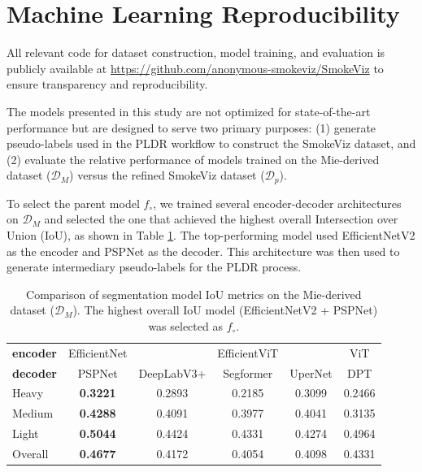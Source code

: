 \documentclass{article}
\begin{document}
\section{Machine Learning Reproducibility}

All relevant code for dataset construction, model training, and evaluation is publicly available at \url{https://github.com/anonymous-smokeviz/SmokeViz} to ensure transparency and reproducibility.

The models presented in this study are not optimized for state-of-the-art performance but are designed to serve two primary purposes: (1) generate pseudo-labels used in the PLDR workflow to construct the SmokeViz dataset, and (2) evaluate the relative performance of models trained on the Mie-derived dataset (\(\mathcal{D}_M\)) versus the refined SmokeViz dataset (\(\mathcal{D}_p\)).

To select the parent model \(f_{\circ}\), we trained several encoder-decoder architectures on \(\mathcal{D}_M\) and selected the one that achieved the highest overall Intersection over Union (IoU), as shown in Table \ref{child}. The top-performing model used EfficientNetV2 as the encoder and PSPNet as the decoder. This architecture was then used to generate intermediary pseudo-labels for the PLDR process.

\begin{table}[!htb] 
    \caption{Comparison of segmentation model IoU metrics on the Mie-derived dataset (\(\mathcal{D}_M\)). The highest overall IoU model (EfficientNetV2 + PSPNet) was selected as \(f_{\circ}\).}
    \centering
    \begin{tabular}{lccccc}
        \toprule
        \textbf{encoder} & EfficientNet\cite{efficientnetv2} & \cite{efficientnetv2} & EfficientViT\cite{efficientvit} & \cite{efficientvit}& ViT \cite{vit} \\
        \textbf{decoder} &  PSPNet\cite{pspnet} & DeepLabV3+\cite{deeplab} & Segformer\cite{segformer} & UperNet \cite{upernet}& DPT\cite{dpt} \\
        \midrule
        Heavy   &	\textbf{0.3221}	& 0.2893	&	0.2185	&	0.3099	&	0.2466 \\
        Medium  &	\textbf{0.4288}	& 0.4091	&	0.3977	&   0.4041	&	0.3135 \\
        Light   &	\textbf{0.5044}	& 0.4424	&	0.4331	&	0.4274	&	0.4964 \\
        Overall &	\textbf{0.4677}	& 0.4172	&   0.4054	&	0.4098	&	0.4331 \\
        \bottomrule
    \end{tabular}
    \label{child}
\end{table}
\end{document}
